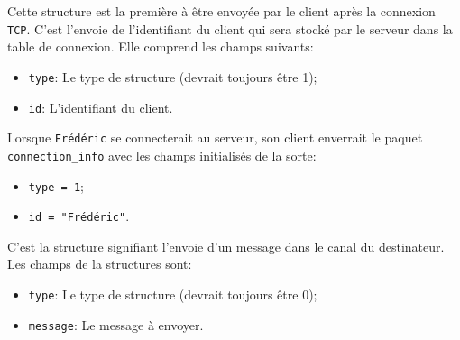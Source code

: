 \documentclass[12pt,french]{article}
\begin{document}
                
                Cette structure est la première à être envoyée par le client après la connexion {\tt
                TCP}. C'est l'envoie de l'identifiant du client qui sera stocké par le serveur dans
                la table de connexion. Elle comprend les champs suivants:
                \begin{itemize}
                    \item {\tt type}: Le type de structure (devrait toujours être 1);
                    \item {\tt id}: L'identifiant du client.
                \end{itemize}
                Lorsque {\tt Frédéric} se connecterait au serveur, son client enverrait le paquet
                {\tt connection\_info} avec les champs initialisés de la sorte:
                \begin{itemize}
                    \item {\tt type = 1};
                    \item {\tt id = "Frédéric"}.
                \end{itemize}

                
                C'est la structure signifiant l'envoie d'un message dans le canal du destinateur.
                Les champs de la structures sont:
                \begin{itemize}
                    \item {\tt type}: Le type de structure (devrait toujours être 0);
                    \item {\tt message}: Le message à envoyer.
                \end{itemize}
\end{document}
